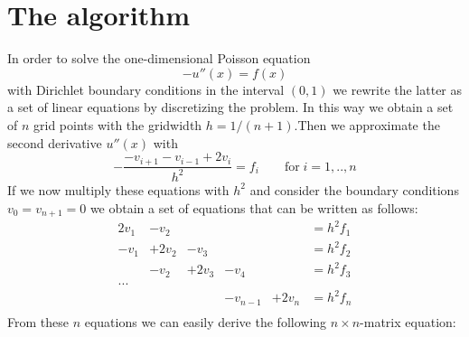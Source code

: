 \documentclass[11pt,a4wide]{article}
\begin{document}
\tableofcontents
\newpage
\section{The algorithm}
In order to solve the one-dimensional Poisson equation
\begin{equation}
-u''(x)=f(x)
\label{eq:1}
\end{equation}
with Dirichlet boundary conditions in the interval $(0,1)$ we rewrite the latter as a set of linear equations by discretizing the problem. In this way we obtain a set of $n$ grid points with the gridwidth $h=1/(n+1)$.Then we approximate the second derivative $u''(x)$ with
\begin{equation}
-\dfrac{-v_{i+1}-v_{i-1}+2v_i}{h^2}=f_i\qquad \text{for}\; i=1,..,n
\label{eq:2}
\end{equation}
If we now multiply these equations with $h^2$ and consider the boundary conditions \mbox{$v_0=v_{n+1}=0$} we obtain a set of equations that can be written as follows:
\begin{equation}
 \begin{matrix}
2v_1 & - v_2 &          &               &          &=h^2f_1 \\
 -v_1 & +2v_2 & -v_3  &               &          &=h^2f_2 \\
         &  -v_2 & +2v_3 & -v_4       &          & =h^2f_3\\
...\\ 
         &           &          & -v_{n-1}& +2v_n & =h^2f_n\\
 \end{matrix}
\label{eq:2.2}
\end{equation}
From these $n$ equations we can easily derive the following $n\times n$-matrix equation:
\end{document}
